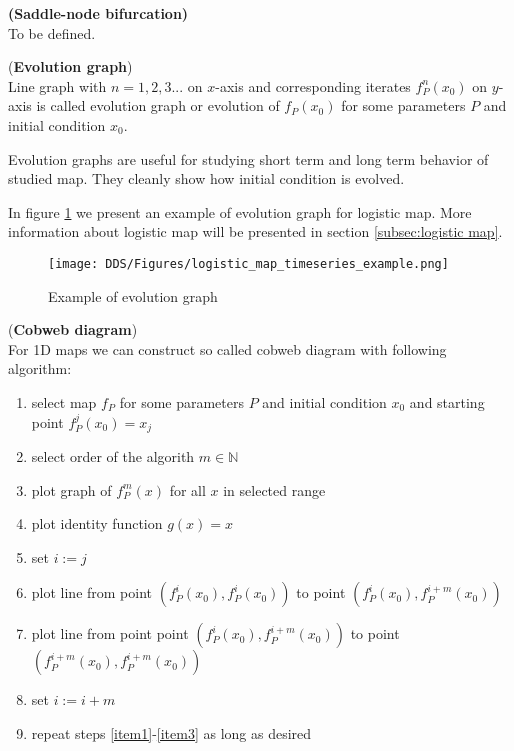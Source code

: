 \begin{definition} \textbf{(Saddle-node bifurcation)} \\
    \label{def:saddle_node_bif}
    To be defined.
\end{definition}

\begin{definition} (\textbf{Evolution graph}) \\
    Line graph with $n=1,2,3...$ on $x$-axis and corresponding iterates $f^{n}_P(x_0)$ on $y$-axis is called evolution graph or evolution of $f_{P}(x_0)$ for some parameters $P$ and initial condition $x_0$.
\end{definition}

\begin{remark}
    Evolution graphs are useful for studying short term and long term behavior of studied map.
    They cleanly show how initial condition is evolved.
\end{remark}

\begin{example}
    In figure \ref{fig:evolution_graph_example} we present an example of evolution graph for logistic map. More information about logistic map will be presented in section \ref{subsec:logistic map}.
    \begin{figure}[!h]
        \centering
        \texttt{[image: DDS/Figures/logistic\_map\_timeseries\_example.png]}
        \caption{Example of evolution graph}
        \label{fig:evolution_graph_example}
    \end{figure}
\end{example}

\begin{definition} (\textbf{Cobweb diagram}) \\
    \label{def:cobweb}
    For 1D maps we can construct so called cobweb diagram with following algorithm:
    \begin{enumerate}
        \item select map $f_P$ for some parameters $P$ and initial condition $x_0$ and starting point $f^{j}_P(x_0) = x_j$
        \item select order of the algorith $m \in \mathbb{N}$
        \item plot graph of $f^{m}_P(x)$ for all $x$ in selected range
        \item plot identity function $g(x) = x$
        \item set $i:=j$

        \item plot line from point $(f^{i}_P(x_0), f^{i}_P(x_0))$ to point $(f^{i}_P(x_0), f^{i+m}_P(x_0))$ \label{item1}
        \item plot line from point point $(f^{i}_P(x_0), f^{i+m}_P(x_0))$ to point $(f^{i+m}_P(x_0), f^{i+m}_P(x_0))$ \label{item2}
        \item set $i:=i+m$ \label{item3}

        \item repeat steps \ref{item1}-\ref{item3} as long as desired
    \end{enumerate}

\end{definition}

